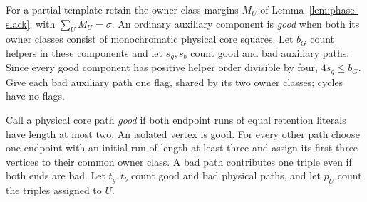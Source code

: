 \documentclass[11pt]{article}
\begin{document}
For a partial template retain the owner-class margins $M_U$ of
Lemma~\ref{lem:phase-slack}, with $\sum_U M_U=\sigma$.
An ordinary auxiliary component is \emph{good} when both its owner classes
consist of monochromatic physical core squares. Let $b_G$ count helpers
in these components and let $s_g,s_b$ count good and bad auxiliary paths.
Since every good component has positive helper order divisible by four,
$4s_g\le b_G$. Give each bad auxiliary path one flag, shared by its two
owner classes; cycles have no flags.

Call a physical core path \emph{good} if both endpoint runs of equal
retention literals have length at most two. An isolated vertex is good.
For every other path choose one endpoint with an initial run of length
at least three and assign its first three vertices to their common owner
class. A bad path contributes one triple even if both ends are bad.
Let $t_g,t_b$ count good and bad physical paths, and let $p_U$ count the
triples assigned to $U$.
\end{document}
